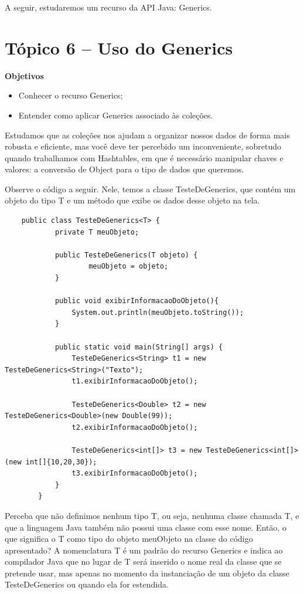 \documentclass[11pt]{article}
\begin{document}
A seguir, estudaremos um recurso da API Java: Generics.

\section{Tópico 6 – Uso do Generics}
\label{sec:org667234e}
\textbf{Objetivos}
\begin{itemize}
\item Conhecer o recurso Generics;
\item Entender como aplicar Generics associado às coleções.
\end{itemize}

Estudamos que as coleções nos ajudam a organizar nossos dados de forma mais robusta e eficiente, mas você deve ter percebido um inconveniente, sobretudo quando trabalhamos com Hashtables, em que é necessário manipular chaves e valores: a conversão de Object para o tipo de dados que queremos.

Observe o código a seguir. Nele, temos a classe TesteDeGenerics, que contém um objeto do tipo T e um método que exibe os dados desse objeto na tela.

\begin{verbatim}
    public class TesteDeGenerics<T> {
            private T meuObjeto;

            public TesteDeGenerics(T objeto) {
                    meuObjeto = objeto;
            }

            public void exibirInformacaoDoObjeto(){
                System.out.println(meuObjeto.toString());
            }

            public static void main(String[] args) {
                TesteDeGenerics<String> t1 = new TesteDeGenerics<String>("Texto");
                t1.exibirInformacaoDoObjeto();

                TesteDeGenerics<Double> t2 = new TesteDeGenerics<Double>(new Double(99));
                t2.exibirInformacaoDoObjeto();

                TesteDeGenerics<int[]> t3 = new TesteDeGenerics<int[]>(new int[]{10,20,30});
                t3.exibirInformacaoDoObjeto();
            }
        }
\end{verbatim}

Perceba que não definimos nenhum tipo T, ou seja, nenhuma classe chamada T, e que a linguagem Java também não possui uma classe com esse nome. Então, o que significa o T como tipo do objeto meuObjeto na classe do código apresentado? A nomenclatura T é um padrão do recurso Generics e indica ao compilador Java que no lugar de T será inserido o nome real da classe que se pretende usar, mas apenas no momento da instanciação de um objeto da classe TesteDeGenerics ou quando ela for estendida.
\end{document}
